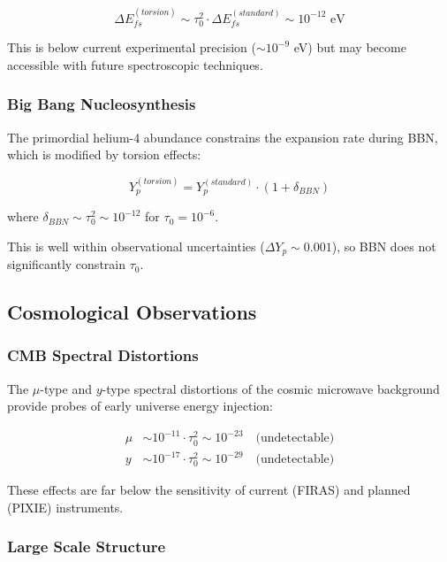 \begin{equation}
    \Delta E_{fs}^{(torsion)} \sim \tau_0^2 \cdot \Delta E_{fs}^{(standard)} \sim 10^{-12} \text{ eV}
\end{equation}

This is below current experimental precision ($\sim 10^{-9}$ eV) but may become accessible with future spectroscopic techniques.

\subsubsection{Big Bang Nucleosynthesis}

The primordial helium-4 abundance constrains the expansion rate during BBN, which is modified by torsion effects:

\begin{equation}
    Y_p^{(torsion)} = Y_p^{(standard)} \cdot (1 + \delta_{BBN})
\end{equation}

where $\delta_{BBN} \sim \tau_0^2 \sim 10^{-12}$ for $\tau_0 = 10^{-6}$.

This is well within observational uncertainties ($\Delta Y_p \sim 0.001$), so BBN does not significantly constrain $\tau_0$.

\subsection{Cosmological Observations}

\subsubsection{CMB Spectral Distortions}

The $\mu$-type and $y$-type spectral distortions of the cosmic microwave background provide probes of early universe energy injection:

\begin{align}
    \mu &\sim 10^{-11} \cdot \tau_0^2 \sim 10^{-23} \quad \text{(undetectable)} \\
    y &\sim 10^{-17} \cdot \tau_0^2 \sim 10^{-29} \quad \text{(undetectable)}
\end{align}

These effects are far below the sensitivity of current (FIRAS) and planned (PIXIE) instruments.

\subsubsection{Large Scale Structure}

